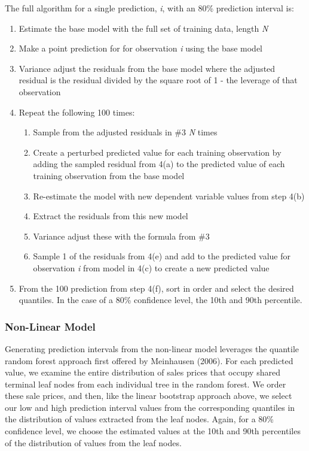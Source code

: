 \documentclass[colTwo]{anon}
\theoremstyle{definition}
\begin{document}
The full algorithm for a single prediction, \textit{i}, with an 80\% prediction interval is:
\begin{enumerate}
\item Estimate the base model with the full set of training data, length \textit{N}
\item Make a point prediction for for observation \textit{i} using the base model
\item Variance adjust the residuals from the base model where the adjusted residual is the residual divided by the square root of 1 - the leverage of that observation
\item Repeat the following 100 times:
\begin{enumerate}
\item Sample from the adjusted residuals in \#3 \textit{N} times
\item Create a perturbed predicted value for each training observation by adding the sampled residual from 4(a) to the predicted value of each training observation from the base model
\item Re-estimate the model with new dependent variable values from step 4(b)
\item Extract the residuals from this new model
\item Variance adjust these with the formula from \#3
\item Sample 1 of the residuals from 4(e) and add to the predicted value for observation \textit{i} from model in 4(c) to create a new predicted value
\end{enumerate}
\item From the 100 prediction from step 4(f), sort in order and select the desired quantiles.  In the case of a 80\% confidence level, the 10th and 90th percentile.
\end{enumerate}

\subsubsection{Non-Linear Model}

Generating prediction intervals from the non-linear model leverages the quantile random forest approach first offered by Meinhausen (2006).  For each predicted value, we examine the entire distribution of sales prices that occupy shared terminal leaf nodes from each individual tree in the random forest.  We order these sale prices, and then, like the linear bootstrap approach above, we select our low and high prediction interval values from the corresponding quantiles in the distribution of values extracted from the leaf nodes. Again, for a 80\% confidence level, we choose the estimated values at the 10th and 90th percentiles of the distribution of values from the leaf nodes.
\end{document}
